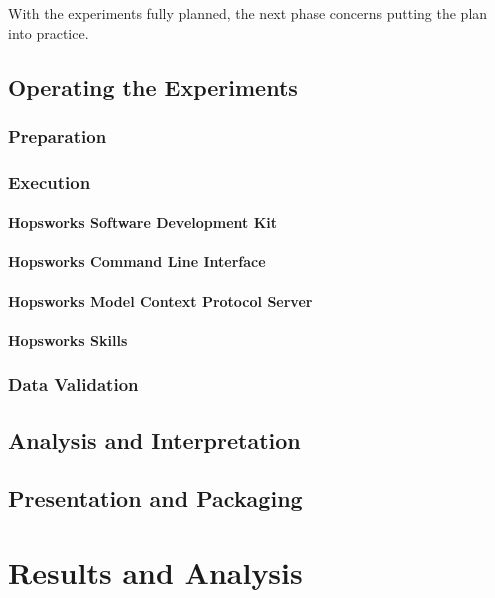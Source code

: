 \documentclass[
english,                 %
bibtex,                  %
includeExtraAbstracts, %
]{kththesis}
\numberwithin{listing}{chapter}
\begin{document}
With the experiments fully planned, the next phase concerns putting the plan into practice.

\section{Operating the Experiments}

\subsection{Preparation}



\subsection{Execution}

\subsubsection{Hopsworks Software Development Kit}
\subsubsection{Hopsworks Command Line Interface}
\subsubsection{Hopsworks Model Context Protocol Server}
\subsubsection{Hopsworks Skills}

\subsection{Data Validation}

\section{Analysis and Interpretation}

\section{Presentation and Packaging}

\cleardoublepage

\chapter{Results and Analysis}
\end{document}
